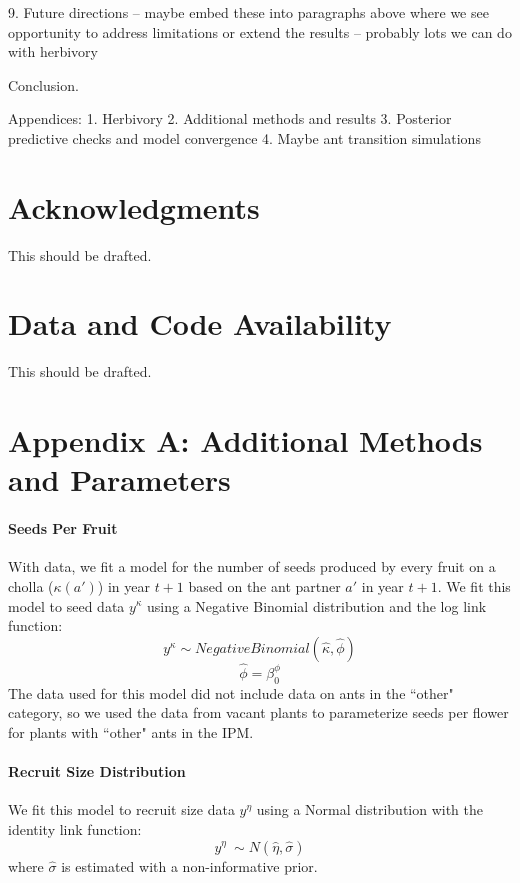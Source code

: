 \documentclass[11pt]{article}
\begin{document}
9. Future directions -- maybe embed these into paragraphs above where we see opportunity to address limitations or extend the results -- probably lots we can do with herbivory

Conclusion. 

Appendices:
1. Herbivory
2. Additional methods and results
3. Posterior predictive checks and model convergence
4. Maybe ant transition simulations



\section*{Acknowledgments}
This should be drafted.

\section*{Data and Code Availability}
This should be drafted.

\section*{Appendix A: Additional Methods and Parameters}

\paragraph{Seeds Per Fruit}
With data\cite{Miller2006}, we fit a model for the number of seeds produced by every fruit on a cholla ($\kappa(a')$) in year $t+1$ based on the ant partner $a'$ in year $t+1$.
We fit this model to seed data $y^{\kappa}$ using a Negative Binomial distribution and the log link function: 
$$y^{\kappa} \sim  Negative Binomial(\hat{\kappa},\hat{\phi})$$
$$\hat{\phi} = \beta_{0}^{\phi}$$
The data used for this model did not include data on ants in the ``other" category, so we used the data from vacant plants to parameterize seeds per flower for plants with ``other" ants in the IPM.

\paragraph{Recruit Size Distribution}
We fit this model to recruit size data $y^{\eta}$ using a Normal distribution with the identity link function: 
$$y^{\eta} ~\sim N(\hat{\eta},\hat{\sigma})$$
where $\hat{\sigma}$ is estimated with a non-informative prior. 
\end{document}
